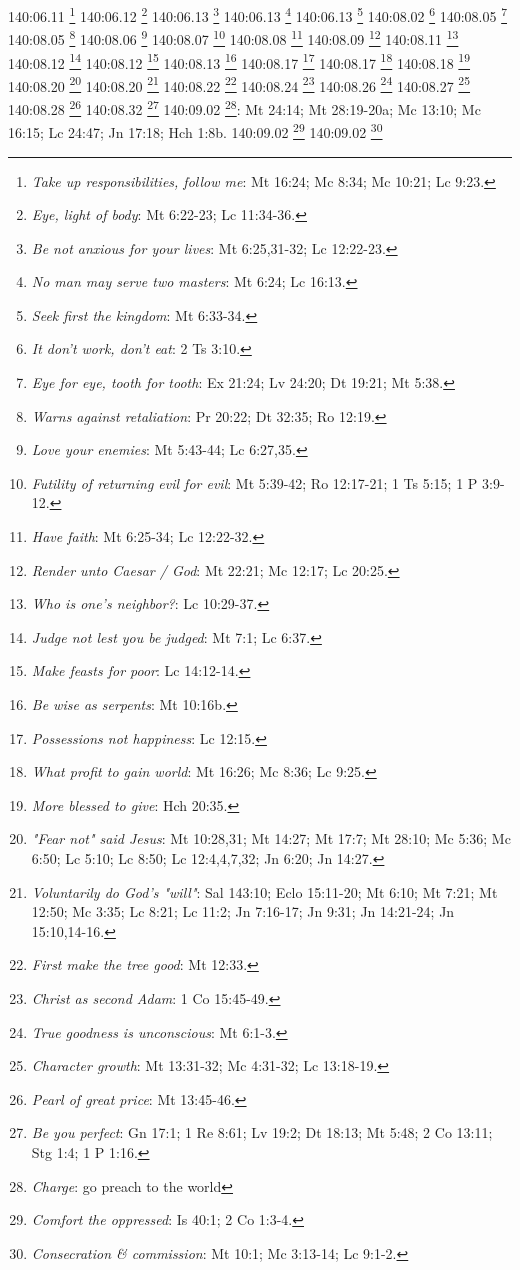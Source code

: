 {140:06.11 \footnote{\textit{Take up responsibilities, follow me}: Mt 16:24; Mc 8:34; Mc 10:21; Lc 9:23.}
140:06.12 \footnote{\textit{Eye, light of body}: Mt 6:22-23; Lc 11:34-36.}
140:06.13 \footnote{\textit{Be not anxious for your lives}: Mt 6:25,31-32; Lc 12:22-23.}
140:06.13 \footnote{\textit{No man may serve two masters}: Mt 6:24; Lc 16:13.}
140:06.13 \footnote{\textit{Seek first the kingdom}: Mt 6:33-34.}
140:08.02 \footnote{\textit{It don't work, don't eat}: 2 Ts 3:10.}
140:08.05 \footnote{\textit{Eye for eye, tooth for tooth}: Ex 21:24; Lv 24:20; Dt 19:21; Mt 5:38.}
140:08.05 \footnote{\textit{Warns against retaliation}: Pr 20:22; Dt 32:35; Ro 12:19.}
140:08.06 \footnote{\textit{Love your enemies}: Mt 5:43-44; Lc 6:27,35.}
140:08.07 \footnote{\textit{Futility of returning evil for evil}: Mt 5:39-42; Ro 12:17-21; 1 Ts 5:15; 1 P 3:9-12.}
140:08.08 \footnote{\textit{Have faith}: Mt 6:25-34; Lc 12:22-32.}
140:08.09 \footnote{\textit{Render unto Caesar / God}: Mt 22:21; Mc 12:17; Lc 20:25.}
140:08.11 \footnote{\textit{Who is one's neighbor?}: Lc 10:29-37.}
140:08.12 \footnote{\textit{Judge not lest you be judged}: Mt 7:1; Lc 6:37.}
140:08.12 \footnote{\textit{Make feasts for poor}: Lc 14:12-14.}
140:08.13 \footnote{\textit{Be wise as serpents}: Mt 10:16b.}
140:08.17 \footnote{\textit{Possessions not happiness}: Lc 12:15.}
140:08.17 \footnote{\textit{What profit to gain world}: Mt 16:26; Mc 8:36; Lc 9:25.}
140:08.18 \footnote{\textit{More blessed to give}: Hch 20:35.}
140:08.20 \footnote{\textit{"Fear not" said Jesus}: Mt 10:28,31; Mt 14:27; Mt 17:7; Mt 28:10; Mc 5:36; Mc 6:50; Lc 5:10; Lc 8:50; Lc 12:4,4,7,32; Jn 6:20; Jn 14:27.}
140:08.20 \footnote{\textit{Voluntarily do God's "will"}: Sal 143:10; Eclo 15:11-20; Mt 6:10; Mt 7:21; Mt 12:50; Mc 3:35; Lc 8:21; Lc 11:2; Jn 7:16-17; Jn 9:31; Jn 14:21-24; Jn 15:10,14-16.}
140:08.22 \footnote{\textit{First make the tree good}: Mt 12:33.}
140:08.24 \footnote{\textit{Christ as second Adam}: 1 Co 15:45-49.}
140:08.26 \footnote{\textit{True goodness is unconscious}: Mt 6:1-3.}
140:08.27 \footnote{\textit{Character growth}: Mt 13:31-32; Mc 4:31-32; Lc 13:18-19.}
140:08.28 \footnote{\textit{Pearl of great price}: Mt 13:45-46.}
140:08.32 \footnote{\textit{Be you perfect}: Gn 17:1; 1 Re 8:61; Lv 19:2; Dt 18:13; Mt 5:48; 2 Co 13:11; Stg 1:4; 1 P 1:16.}
140:09.02 \footnote{\textit{Charge}: go preach to the world}: Mt 24:14; Mt 28:19-20a; Mc 13:10; Mc 16:15; Lc 24:47; Jn 17:18; Hch 1:8b.}
140:09.02 \footnote{\textit{Comfort the oppressed}: Is 40:1; 2 Co 1:3-4.}
140:09.02 \footnote{\textit{Consecration & commission}: Mt 10:1; Mc 3:13-14; Lc 9:1-2.}
